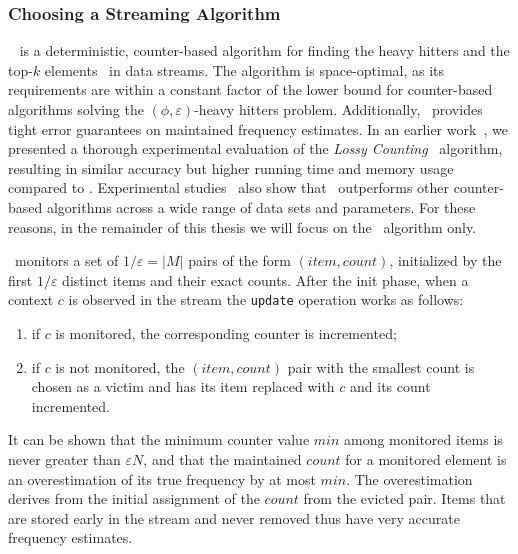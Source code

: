 \subsubsection*{Choosing a Streaming Algorithm}
{\em \spacesaving}~\cite{Metwally06} is a deterministic, counter-based algorithm for finding the heavy hitters and the top-$k$ elements~\cite{Charikar02} in data streams. The algorithm is space-optimal, as its requirements are within a constant factor of the lower bound for counter-based algorithms solving the $(\phi,\varepsilon)$-heavy hitters problem. Additionally, \spacesaving\ provides tight error guarantees on maintained frequency estimates. In an earlier work~\cite{Delia2011}, we presented a thorough
experimental evaluation of the {\em Lossy Counting}~\cite{Manku02} algorithm, resulting in similar accuracy but higher running time and memory usage compared to \spacesaving. Experimental studies~\cite{Cormode08,Manerikar2009} also show that \spacesaving\ outperforms other counter-based algorithms across a wide range of data sets and parameters. For these reasons, in the remainder of this thesis we will focus on the \spacesaving\ algorithm only.


\spacesaving\ monitors a set of $1/\varepsilon=|M|$ pairs of the form $(item, count)$, initialized by the first $1/\varepsilon$ distinct items and their exact counts. After the init phase, when a context $c$ is observed in the stream the {\tt update} operation works as follows: 

\begin{enumerate}[parsep=0pt]
\item if $c$ is monitored, the corresponding counter is incremented; 
\item if $c$ is not monitored, the $(item, count)$ pair with the smallest count is chosen as a victim and has its item replaced with $c$ and its count incremented.
\end{enumerate}

\noindent It can be shown that the minimum counter value $min$ among monitored items is never greater than $\varepsilon N$, and that the maintained $count$ for a monitored element is an overestimation of its true frequency by at most $min$. The overestimation derives from the initial assignment of the $count$ from the evicted pair. Items that are stored early in the stream and never removed thus have very accurate frequency estimates.


